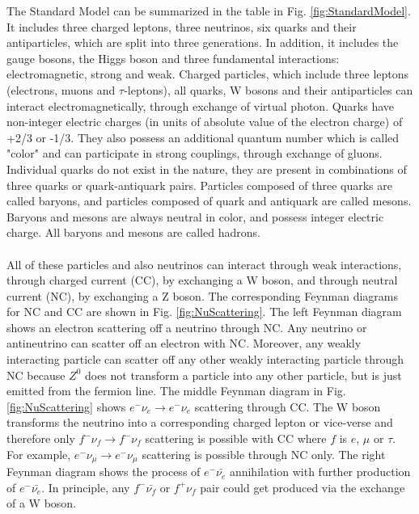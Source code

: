 The Standard Model can be summarized in the table in Fig. \ref{fig:StandardModel}. It includes three charged leptons, three neutrinos, six quarks and their antiparticles, which are split into three generations. In addition, it includes the gauge bosons, the Higgs boson and three fundamental interactions: electromagnetic, strong and weak. Charged particles, which include three leptons (electrons, muons and $\tau$-leptons), all quarks, W bosons and their antiparticles can interact electromagnetically, through exchange of virtual photon. Quarks have non-integer electric charges (in units of absolute value of the electron charge) of +2/3 or -1/3. They also possess an additional quantum number which is called "color" and can participate in strong couplings, through exchange of gluons. Individual quarks do not exist in the nature, they are present in combinations of three quarks or quark-antiquark pairs. Particles composed of three quarks are called baryons, and particles composed of quark and antiquark are called mesons. Baryons and mesons are always neutral in color, and possess integer electric charge. All baryons and mesons are called hadrons.\\ \\
All of these particles and also neutrinos can interact through weak interactions, through charged current (CC), by exchanging a W boson, and through neutral current (NC), by exchanging a Z boson. The corresponding Feynman diagrams for NC and CC are shown in Fig. \ref{fig:NuScattering}. The left Feynman diagram shows an electron scattering off a neutrino through NC. Any neutrino or antineutrino can scatter off an electron with NC. Moreover, any weakly interacting particle can scatter off any other weakly interacting particle through NC because $Z^0$ does not transform a particle into any other particle, but is just emitted from the fermion line. The middle Feynman diagram in Fig. \ref{fig:NuScattering} shows $e^- \nu_e \rightarrow e^- \nu_e$ scattering through CC. The W boson transforms the neutrino into a corresponding charged lepton or vice-verse and therefore only $f^- \nu_f \rightarrow f^- \nu_f$ scattering is possible with CC where $f$ is $e$, $\mu$ or $\tau$. For example, $e^- \nu_\mu \rightarrow e^- \nu_\mu$ scattering is possible through NC only. The right Feynman diagram shows the process of $e^- \bar{\nu_e}$ annihilation with further production of $e^- \bar{\nu_e}$. In principle, any $f^- \bar{\nu_f}$ or $f^+ \nu_f$ pair could get produced via the exchange of a W boson.\\ \\
